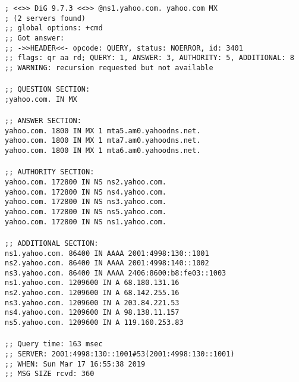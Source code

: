 \documentclass[a4paper,11pt]{article}
\newcommand{\code}{\texttt}
\begin{document}
\begin{enumerate}[leftmargin=*]
	\code{; <<>> DiG 9.7.3 <<>> @ns1.yahoo.com. yahoo.com MX\\
	; (2 servers found)\\
	;; global options: +cmd\\
	;; Got answer:\\
	;; ->>HEADER<<- opcode: QUERY, status: NOERROR, id: 3401\\
	;; flags: qr aa rd; QUERY: 1, ANSWER: 3, AUTHORITY: 5, ADDITIONAL: 8\\
	;; WARNING: recursion requested but not available\\
	\\
	;; QUESTION SECTION:\\
	;yahoo.com.			IN	MX\\
	\\
	;; ANSWER SECTION:\\
	yahoo.com.		1800	IN	MX	1 mta5.am0.yahoodns.net.\\
	yahoo.com.		1800	IN	MX	1 mta7.am0.yahoodns.net.\\
	yahoo.com.		1800	IN	MX	1 mta6.am0.yahoodns.net.\\
	\\
	;; AUTHORITY SECTION:\\
	yahoo.com.		172800	IN	NS	ns2.yahoo.com.\\
	yahoo.com.		172800	IN	NS	ns4.yahoo.com.\\
	yahoo.com.		172800	IN	NS	ns3.yahoo.com.\\
	yahoo.com.		172800	IN	NS	ns5.yahoo.com.\\
	yahoo.com.		172800	IN	NS	ns1.yahoo.com.\\
	\\
	;; ADDITIONAL SECTION:\\
	ns1.yahoo.com.		86400	IN	AAAA	2001:4998:130::1001\\
	ns2.yahoo.com.		86400	IN	AAAA	2001:4998:140::1002\\
	ns3.yahoo.com.		86400	IN	AAAA	2406:8600:b8:fe03::1003\\
	ns1.yahoo.com.		1209600	IN	A	68.180.131.16\\
	ns2.yahoo.com.		1209600	IN	A	68.142.255.16\\
	ns3.yahoo.com.		1209600	IN	A	203.84.221.53\\
	ns4.yahoo.com.		1209600	IN	A	98.138.11.157\\
	ns5.yahoo.com.		1209600	IN	A	119.160.253.83\\
	\\
	;; Query time: 163 msec\\
	;; SERVER: 2001:4998:130::1001\#53(2001:4998:130::1001)\\
	;; WHEN: Sun Mar 17 16:55:38 2019\\
	;; MSG SIZE  rcvd: 360\\}


\end{enumerate}
\end{document}
